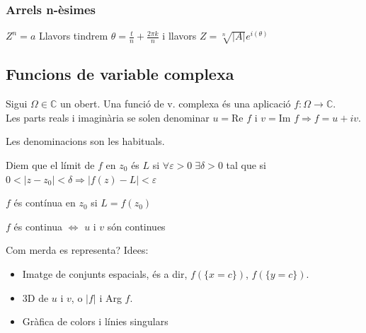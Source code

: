 \documentclass[../main.tex]{subfiles}
\begin{document}
\subsubsection{Arrels n-èsimes}
$Z^n = a$
Llavors tindrem $\theta = \frac{t}{n} + \frac{2\pi k}{n}$ i llavors $Z = \sqrt[n]{|A|}e^{i\left(\theta\right)}$

\subsection{Funcions de variable complexa}
Sigui $\Omega \in \mathbb{C}$ un obert. Una funció de v. complexa és una aplicació $f: \Omega \to \mathbb{C}$.\\
Les parts reals i imaginària se solen denominar $u = \text{Re }f$ i $v = \text{Im }f \Rightarrow f = u + iv$.\\
\begin{definicio}
	Les denominacions son les habituals.
\end{definicio}
\begin{definicio}
	Diem que el límit de $f$ en $z_0$ és $L$ si $\forall \varepsilon > 0\;\exists \delta > 0$ tal que si $0 < |z - z_0| < \delta \Rightarrow |f(z) - L| < \varepsilon$
\end{definicio}
\begin{definicio}
	$f$ és contínua en $z_0$ si $L = f(z_0)$
\end{definicio}
\begin{proposicio}
	$f$ és continua $\iff$ $u$ i $v$ són continues
\end{proposicio}
Com merda es representa? Idees:
\begin{itemize}
	\item Imatge de conjunts espacials, és a dir, $f(\{x = c\})$, $f(\{y = c\})$.
	\item 3D de $u$ i $v$, o $|f|$ i Arg $f$.
	\item Gràfica de colors i línies singulars
\end{itemize}
\end{document}
